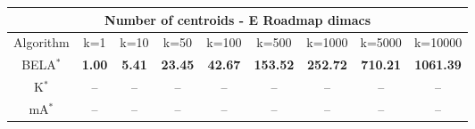 \begin{tabular}{c|cccccccc}\toprule
\multicolumn{9}{c}{Number of centroids - E Roadmap dimacs}\\ \midrule
Algorithm & k=1 & k=10 & k=50 & k=100 & k=500 & k=1000 & k=5000 & k=10000 \\ \midrule
BELA$^*$ & \textbf{1.00} & \textbf{5.41} & \textbf{23.45} & \textbf{42.67} & \textbf{153.52} & \textbf{252.72} & \textbf{710.21} & \textbf{1061.39} \\
K$^*$ & -- & -- & -- & -- & -- & -- & -- & -- \\
mA$^*$ & -- & -- & -- & -- & -- & -- & -- & -- \\ \bottomrule 
\end{tabular}
